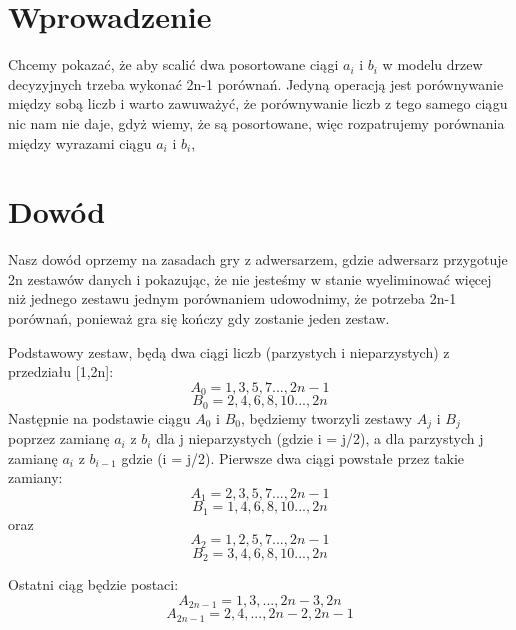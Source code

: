 \documentclass[12pt,a4paper]{article}
\begin{document}
\section{Wprowadzenie}
Chcemy pokazać, że aby scalić dwa posortowane ciągi $a_i$ i $b_i$ w modelu drzew decyzyjnych trzeba wykonać 2n-1 porównań. Jedyną operacją jest porównywanie między sobą liczb i warto zawuważyć, że porównywanie liczb z tego samego ciągu nic nam nie daje, gdyż wiemy, że są posortowane, więc rozpatrujemy porównania między wyrazami ciągu $a_i$ i $b_i$,

\section{Dowód}
Nasz dowód oprzemy na zasadach gry z adwersarzem, gdzie adwersarz przygotuje 2n zestawów danych i pokazując, że nie jesteśmy w stanie wyeliminować więcej niż jednego zestawu jednym porównaniem udowodnimy, że potrzeba 2n-1 porównań, ponieważ gra się kończy gdy zostanie jeden zestaw.

Podstawowy zestaw, będą dwa ciągi liczb (parzystych i nieparzystych) z przedziału [1,2n]:
$$ A_0 = 1, 3, 5, 7 ..., 2n - 1$$
$$ B_0 = 2, 4, 6, 8, 10 ..., 2n$$
Następnie na podstawie ciągu $A_0$ i $B_0$, będziemy tworzyli zestawy $A_j$ i $B_j$ poprzez zamianę $a_i$ z $b_i$ dla j nieparzystych (gdzie i = j/2), a dla parzystych j zamianę $a_i$ z $b_{i-1}$ gdzie (i = j/2).
Pierwsze dwa ciągi powstałe przez takie zamiany:
$$ A_1 = 2, 3, 5, 7 ..., 2n - 1$$
$$ B_1 = 1, 4, 6, 8, 10 ..., 2n$$
oraz
$$ A_2 = 1, 2, 5, 7 ..., 2n - 1$$
$$ B_2 = 3, 4, 6, 8, 10 ..., 2n$$

Ostatni ciąg będzie postaci:
$$A_{2n-1} = 1, 3, ... , 2n-3, 2n$$
$$A_{2n-1} = 2, 4, ... , 2n-2, 2n-1$$
\end{document}
